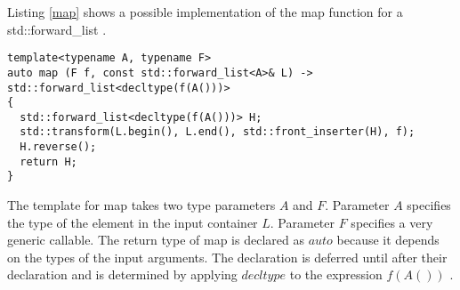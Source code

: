 \documentclass[12pt,fleqn]{article}
\begin{document}
Listing \ref{map} shows a possible implementation of the map function for a std::forward\_list \cite{std::forward_list, josuttis}.

\begin{lstlisting}[caption=map for std::forward\_list,label=map]
template<typename A, typename F>
auto map (F f, const std::forward_list<A>& L) -> std::forward_list<decltype(f(A()))>
{
  std::forward_list<decltype(f(A()))> H;
  std::transform(L.begin(), L.end(), std::front_inserter(H), f);
  H.reverse();
  return H;
}
\end{lstlisting}

The template for map takes two type parameters $A$ and $F$. 
Parameter $A$ specifies the type of the element in the input container $L$.  
Parameter $F$ specifies a very generic callable. 
The return type of map is declared as $auto$ because it depends on the types of the input arguments.
The declaration is deferred until after their declaration and is determined by applying $decltype$ to the expression $f(A())$ \cite{josuttis, auto, decltype}.
\end{document}
